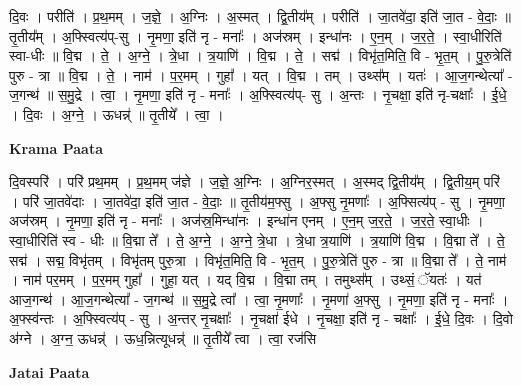 \documentclass[17pt]{extarticle}
\begin{document}
दि॒वः । परीति॑ । प्र॒थ॒मम् । ज॒ज्ञे॒ । अ॒ग्निः । अ॒स्मत् । द्वि॒तीय᳚म् । परीति॑ । जा॒तवे॑दा॒ इति॑ जा॒त - वे॒दाः॒ ॥ तृ॒तीय᳚म् । अ॒फ्स्वित्य॑प्-सु । नृ॒मणा॒ इति॑ नृ - मनाः᳚ । अज॑स्रम् । इन्धा॑नः । ए॒न॒म् । ज॒र॒ते॒ । स्वा॒धीरिति॑ स्वा-धीः ॥ वि॒द्म । ते॒ । अ॒ग्ने॒ । त्रे॒धा । त्र॒याणि॑ । वि॒द्म । ते॒ । सद्म॑ । विभृ॑त॒मिति॒ वि - भृ॒त॒म् । पु॒रु॒त्रेति॑ पुरु - त्रा ॥ वि॒द्म । ते॒ । नाम॑ । प॒र॒मम् । गुहा᳚ । यत् । वि॒द्म । तम् । उथ्स᳚म् । यतः॑ । आ॒ज॒गन्थेत्या᳚ - ज॒गन्थ॑ ॥ स॒मु॒द्रे । त्वा॒ । नृ॒मणा॒ इति॑ नृ - मनाः᳚ । अ॒फ्स्वित्य॑प्- सु । अ॒न्तः । नृ॒चक्षा॒ इति॑ नृ-चक्षाः᳚ । ई॒धे॒ । दि॒वः । अ॒ग्ने॒ । ऊधन्न्॑ ॥ तृ॒तीये᳚ । त्वा॒ ।  \newline


\textbf{Krama Paata} \newline

दि॒वस्परि॑ । परि॑ प्रथ॒मम् । प्र॒थ॒मम् ज॑ज्ञे । ज॒ज्ञे॒ अ॒ग्निः । अ॒ग्निर॒स्मत् । अ॒स्मद् द्वि॒तीय᳚म् । द्वि॒तीय॒म् परि॑ । परि॑ जा॒तवे॑दाः । जा॒तवे॑दा॒ इति॑ जा॒त - वे॒दाः॒ ॥ तृ॒तीय॑म॒फ्सु । अ॒फ्सु नृ॒मणाः᳚ । अ॒फ्सित्य॑प् - सु । नृ॒मणा॒ अज॑स्रम् । नृ॒मणा॒ इति॑ नृ - मनाः᳚ । अज॑स्र॒मिन्धा॑नः । इन्धा॑न एनम् । ए॒न॒म् ज॒र॒ते॒ । ज॒र॒ते॒ स्वा॒धीः । स्वा॒धीरिति॑ स्व - धीः ॥ वि॒द्मा ते᳚ । ते॒ अ॒ग्ने॒ । अ॒ग्ने॒ त्रे॒धा । त्रे॒धा त्र॒याणि॑ । त्र॒याणि॑ वि॒द्म । वि॒द्मा ते᳚ । ते॒ सद्म॑ । सद्म॒ विभृ॑तम् । विभृ॑तम् पुरु॒त्रा । विभृ॑त॒मिति॒ वि - भृ॒त॒म् । पु॒रु॒त्रेति॑ पुरु - त्रा ॥ वि॒द्मा ते᳚ । ते॒ नाम॑ । नाम॑ पर॒मम् । प॒र॒मम् गुहा᳚ । गुहा॒ यत् । यद् वि॒द्म । वि॒द्मा तम् । तमुथ्स᳚म् । उथ्सं॒ ॅयतः॑ । यत॑ आज॒गन्थ॑ । आ॒ज॒गन्थेत्या᳚ - ज॒गन्थ॑ ॥ स॒मु॒द्रे त्वा᳚ । त्वा॒ नृ॒मणाः᳚ । नृ॒मणा॑ अ॒फ्सु । नृ॒मणा॒ इति॑ नृ - मनाः᳚ । अ॒फ्स्व॑न्तः । अ॒फ्स्वित्य॑प् - सु । अ॒न्तर् नृ॒चक्षाः᳚ । नृ॒चक्षा॑ ईधे । नृ॒चक्षा॒ इति॑ नृ - चक्षाः᳚ । ई॒धे॒ दि॒वः । दि॒वो अ॑ग्ने । अ॒ग्न॒ ऊधन्न्॑ । ऊध॒न्नित्यूधन्न्॑ ॥ तृ॒तीये᳚ त्वा । त्वा॒ रज॑सि \newline

\textbf{Jatai Paata} \newline
\end{document}
